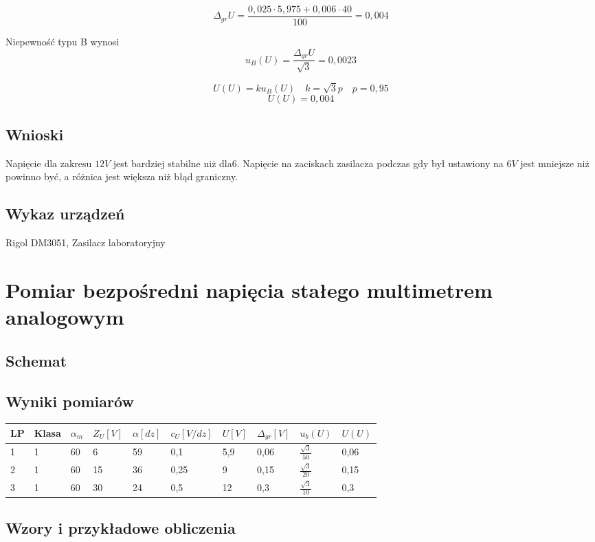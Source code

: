 \documentclass[11pt]{article}
\begin{document}
$$ \Delta_{gr}U = \frac{0,025 \cdot 5,975 + 0,006 \cdot 40}{100} = 0,004$$

Niepewność typu B wynosi 
$$ u_B(U) = \frac{\Delta_{gr}U}{\sqrt{3}} = 0,0023$$

$$ U(U) = k u_B(U) \quad k = \sqrt{3}p \quad p = 0,95 $$
$$ U(U) = 0,004 $$

\subsection{Wnioski}
Napięcie dla zakresu $12V$ jest bardziej stabilne niż dla$6$. Napięcie na zaciskach zasilacza podczas gdy był ustawiony na $6V$ jest mniejsze niż powinno być, a różnica jest większa niż błąd graniczny.

\subsection{Wykaz urządzeń}
Rigol DM3051, Zasilacz laboratoryjny

\section{Pomiar bezpośredni napięcia stałego multimetrem analogowym}

\subsection{Schemat}

\subsection{Wyniki pomiarów}

\begin{tabular}{|l|l|l|l|l|l|l|l|l|l|}
\hline
	LP & Klasa & $\alpha_m$ & $Z_{U}[V]$ & $\alpha[dz]$ & $c_U[V/dz]$ & $U[V]$ & $\Delta_{gr}[V]$ & $u_b(U)$ & $U(U)$\\
\hline
	1 & 1 & 60 & 6 & 59 & 0,1 & 5,9 & 0,06 & $\frac{\sqrt{3}}{50}$ & 0,06\\
\hline
	2 & 1 & 60 & 15 & 36 & 0,25 & 9 & 0,15 & $\frac{\sqrt{3}}{20}$ & 0,15\\
\hline
	3 & 1 & 60 & 30 & 24 & 0,5 & 12 & 0,3 & $\frac{\sqrt{3}}{10}$ & 0,3 \\
\hline
\end{tabular}

\subsection{Wzory i przykładowe obliczenia}
\end{document}
